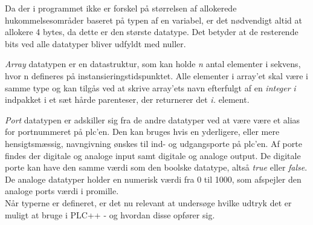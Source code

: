 \noindent Da der i programmet ikke er forskel på størrelsen af allokerede hukommelsesområder baseret på typen af en variabel, er det nødvendigt altid at allokere 4 bytes, da dette er den største datatype. Det betyder at de resterende bits ved alle datatyper bliver udfyldt med nuller.

\textit{Array} datatypen er en datastruktur, som kan holde \textit{n} antal elementer i sekvens, hvor n defineres på instansieringstidspunktet. Alle elementer i array'et skal være i samme type og kan tilgås ved at skrive array'ets navn efterfulgt af en \textit{integer} \textit{i} indpakket i et sæt hårde parenteser, der returnerer det \textit{i.} element.

\textit{Port} datatypen er adskiller sig fra de andre datatyper ved at være være et alias for portnummeret på \gls{plc}'en. Den kan bruges hvis en yderligere, eller mere hensigtsmæssig, navngivning ønskes til ind- og udgangsporte på \gls{plc}'en.
Af porte findes der digitale og analoge input samt digitale og analoge output. De digitale porte kan have den samme værdi som den boolske datatype, altså \textit{true} eller \textit{false}. De analoge datatyper holder en numerisk værdi fra 0 til 1000, som afspejler den analoge ports værdi i promille.\\

\noindent Når typerne er defineret, er det nu relevant at undersøge hvilke udtryk det er muligt at bruge i PLC++ - og hvordan disse opfører sig.